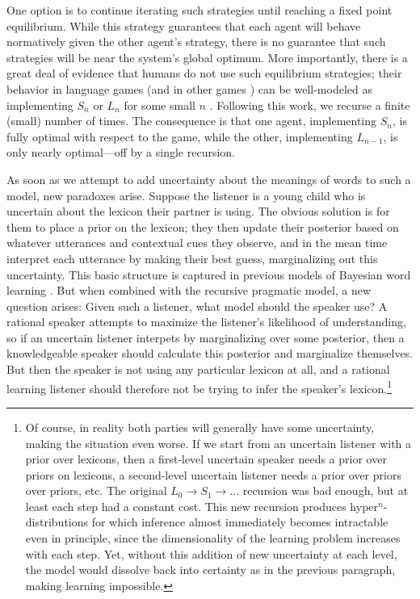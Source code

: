 \documentclass{article} %
\begin{document}
One option is to continue iterating such
strategies until reaching a fixed point equilibrium. While this
strategy guarantees that each agent will behave normatively given the
other agent's strategy, there is no guarantee that such strategies
will be near the system's global optimum. More importantly, there is a
great deal of
evidence that humans do not use such equilibrium strategies; their behavior in language
games (and in other games \cite{camerer2004}) can be well-modeled as
implementing $S_n$ or $L_n$ for some small $n$
\cite{frank2012}. Following this work, we recurse a finite (small)
number of times. The consequence is that one agent, implementing
$S_n$, is fully optimal with respect to the game, while the other,
implementing $L_{n-1}$, is only nearly optimal---off by a single
recursion.

As soon as we attempt to add uncertainty about the meanings of words
to such a model, new paradoxes arise. Suppose the listener is a young
child who is uncertain about the lexicon their partner is using. The
obvious solution is for them to place a prior on the lexicon; they
then update their posterior based on whatever utterances and
contextual cues they observe, and in the mean time interpret each
utterance by making their best guess, marginalizing out this
uncertainty. This basic structure is captured in previous models of
Bayesian word learning \cite{frank2009}. But when combined with the
recursive pragmatic model, a new question arises: Given such a
listener, what model should the speaker use? A rational speaker
attempts to maximize the listener's likelihood of understanding, so if
an uncertain listener interpets by marginalizing over some posterior,
then a knowledgeable speaker should calculate this posterior and
marginalize themselves. But then the speaker is not using any
particular lexicon at all, and a rational learning listener should
therefore not be trying to infer the speaker's lexicon.\footnote{Of
  course, in reality both parties will generally have some
  uncertainty, making the situation even worse. If we start from an
  uncertain listener with a prior over lexicons, then a first-level
  uncertain speaker needs a prior over priors on lexicons, a
  second-level uncertain listener needs a prior over priors over
  priors, etc. The original $L_0 \rightarrow S_1 \rightarrow \dots$
  recursion was bad enough, but at least each step had a constant
  cost. This new recursion produces hyper$^n$-distributions for which
  inference almost immediately becomes intractable even in principle,
  since the dimensionality of the learning problem increases with each
  step. Yet, without this addition of new uncertainty at each level,
  the model would dissolve back into certainty as in the previous
  paragraph, making learning
  impossible.}
\end{document}

